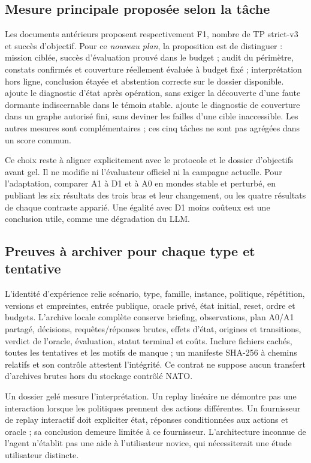 \documentclass[11pt,a4paper]{article}
\newcommand{\code}[1]{{\small\ttfamily\path{#1}}}
\newcommand{\scenariolink}[1]{\hyperref[scenario:#1]{\code{#1}}}
\begin{document}
\subsection{Mesure principale proposée selon la tâche}
Les documents antérieurs proposent respectivement F1, nombre de TP strict-v3 et succès d'objectif. Pour ce \emph{nouveau plan}, la proposition est de distinguer : mission ciblée, succès d'évaluation prouvé dans le budget ; audit du périmètre, constats confirmés et couverture réellement évaluée à budget fixé ; interprétation hors ligne, conclusion étayée et abstention correcte sur le dossier disponible. \scenariolink{s_ota_interruption} ajoute le diagnostic d'état après opération, sans exiger la découverte d'une faute dormante indiscernable dans le témoin stable. \scenariolink{s_reseau_inaccessible} ajoute le diagnostic de couverture dans un graphe autorisé fini, sans deviner les failles d'une cible inaccessible. Les autres mesures sont complémentaires ; ces cinq tâches ne sont pas agrégées dans un score commun.

Ce choix reste à aligner explicitement avec le protocole et le dossier d'objectifs avant gel. Il ne modifie ni l'évaluateur officiel ni la campagne actuelle. Pour l'adaptation, comparer A1 à D1 et à A0 en mondes stable et perturbé, en publiant les six résultats des trois bras et leur changement, ou les quatre résultats de chaque contraste apparié. Une égalité avec D1 moins coûteux est une conclusion utile, comme une dégradation du LLM.

\subsection{Preuves à archiver pour chaque type et tentative}
L'identité d'expérience relie scénario, type, famille, instance, politique, répétition, versions et empreintes, entrée publique, oracle privé, état initial, reset, ordre et budgets. L'archive locale complète conserve briefing, observations, plan A0/A1 partagé, décisions, requêtes/réponses brutes, effets d'état, origines et transitions, verdict de l'oracle, évaluation, statut terminal et coûts. Inclure fichiers cachés, toutes les tentatives et les motifs de manque ; un manifeste SHA-256 à chemins relatifs et son contrôle attestent l'intégrité. Ce contrat ne suppose aucun transfert d'archives brutes hors du stockage contrôlé NATO.

Un dossier gelé mesure l'interprétation. Un replay linéaire ne démontre pas une interaction lorsque les politiques prennent des actions différentes. Un fournisseur de replay interactif doit expliciter état, réponses conditionnées aux actions et oracle ; sa conclusion demeure limitée à ce fournisseur. L'architecture inconnue de l'agent n'établit pas une aide à l'utilisateur novice, qui nécessiterait une étude utilisateur distincte.
\end{document}
